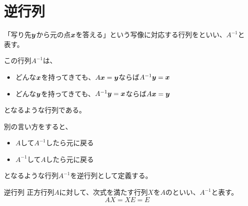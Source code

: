 \documentclass[../../../topic_linear-algebra]{subfiles}
\begin{document}
\sectionline
\section{逆行列}

「写り先$\vb*{y}$から元の点$\vb*{x}$を答える」という写像に対応する行列をといい、$A^{-1}$と表す。

\br

この行列$A^{-1}$は、
\begin{itemize}
  \item どんな$\vb*{x}$を持ってきても、$A\vb*{x} = \vb*{y}$ならば$A^{-1}\vb*{y} = \vb*{x}$
  \item どんな$\vb*{y}$を持ってきても、$A^{-1}\vb*{y} = \vb*{x}$ならば$A\vb*{x} = \vb*{y}$
\end{itemize}
となるような行列である。

\begin{center}
\end{center}

別の言い方をすると、
\begin{itemize}
  \item $A$して$A^{-1}$したら元に戻る
  \item $A^{-1}$して$A$したら元に戻る
\end{itemize}
となるような行列$A^{-1}$を逆行列として定義する。

\begin{definition*}{逆行列}
  正方行列$A$に対して、次式を満たす行列$X$を$A$のといい、$A^{-1}$と表す。
  \begin{equation*}
    AX = XE = E
  \end{equation*}
\end{definition*}
\end{document}
